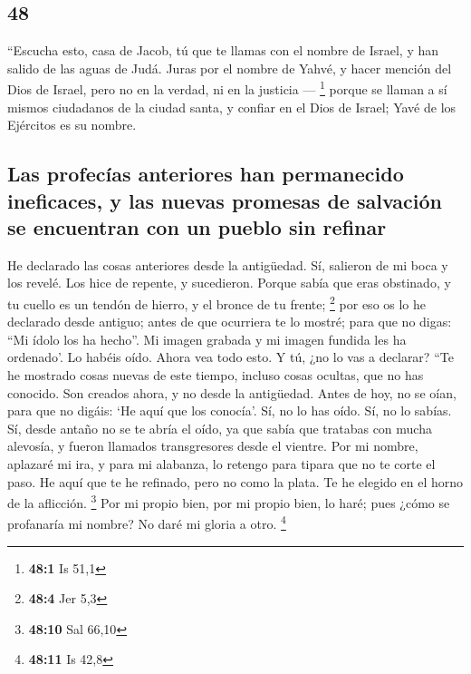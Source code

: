 \begin{paracol}{2}
\hypertarget{section-94}{%
\section{48}\label{section-94}}

 ``Escucha esto, casa de Jacob, tú que te llamas con el
nombre de Israel, y han salido de las aguas de Judá. Juras por el nombre
de Yahvé, y hacer mención del Dios de Israel, pero no en la verdad, ni
en la justicia --- \footnote{\textbf{48:1} Is 51,1} 
porque se llaman a sí mismos ciudadanos de la ciudad santa, y confiar en
el Dios de Israel; Yavé de los Ejércitos es su nombre.

\hypertarget{las-profecuxedas-anteriores-han-permanecido-ineficaces-y-las-nuevas-promesas-de-salvaciuxf3n-se-encuentran-con-un-pueblo-sin-refinar}{%
\subsection{Las profecías anteriores han permanecido ineficaces, y las
nuevas promesas de salvación se encuentran con un pueblo sin
refinar}\label{las-profecuxedas-anteriores-han-permanecido-ineficaces-y-las-nuevas-promesas-de-salvaciuxf3n-se-encuentran-con-un-pueblo-sin-refinar}}

 He declarado las cosas anteriores desde la antigüedad.
Sí, salieron de mi boca y los revelé. Los hice de repente, y sucedieron.
 Porque sabía que eras obstinado, y tu cuello es un tendón
de hierro, y el bronce de tu frente; \footnote{\textbf{48:4} Jer 5,3}
 por eso os lo he declarado desde antiguo; antes de que
ocurriera te lo mostré; para que no digas: ``Mi ídolo los ha hecho''. Mi
imagen grabada y mi imagen fundida les ha ordenado'.  Lo
habéis oído. Ahora vea todo esto. Y tú, ¿no lo vas a declarar? ``Te he
mostrado cosas nuevas de este tiempo, incluso cosas ocultas, que no has
conocido.  Son creados ahora, y no desde la antigüedad.
Antes de hoy, no se oían, para que no digáis: `He aquí que los conocía'.
 Sí, no lo has oído. Sí, no lo sabías. Sí, desde antaño no
se te abría el oído, ya que sabía que tratabas con mucha alevosía, y
fueron llamados transgresores desde el vientre.  Por mi
nombre, aplazaré mi ira, y para mi alabanza, lo retengo para tipara que
no te corte el paso.  He aquí que te he refinado, pero no
como la plata. Te he elegido en el horno de la aflicción. \footnote{\textbf{48:10}
  Sal 66,10}  Por mi propio bien, por mi propio bien, lo
haré; pues ¿cómo se profanaría mi nombre? No daré mi gloria a otro.
\footnote{\textbf{48:11} Is 42,8}


\end{paracol}
